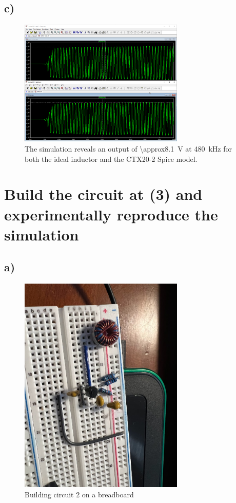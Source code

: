 \documentclass{article}
\begin{document}
	\subsection*{c)}
	
	\begin{figure}[H]
	    \centering
	    \includegraphics[width=0.7\textwidth]{sim2-idelaVsActual}
	    \caption{The simulation reveals an output of \SI{\approx8.1}{\volt} at \SI{480}{\kilo\hertz} for both the ideal inductor and the CTX20-2 Spice model.}
	\end{figure}	
	
	
	\section{Build the circuit at (3) and experimentally reproduce the simulation}

	\subsection*{a)}
	
	\begin{figure}[H]
	    \centering
	    \includegraphics[width=0.7\textwidth]{circuit2}
	    \caption{Building circuit 2 on a breadboard }
	\end{figure}	
	
\end{document}
